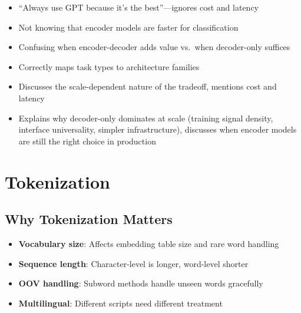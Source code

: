 \begin{interviewq}
\redflags
\begin{itemize}
    \item ``Always use GPT because it's the best''---ignores cost and latency
    \item Not knowing that encoder models are faster for classification
    \item Confusing when encoder-decoder adds value vs.\ when decoder-only suffices
\end{itemize}


\goodgreat
\begin{itemize}
    \item {} Correctly maps task types to architecture families
    \item {} Discusses the scale-dependent nature of the tradeoff, mentions cost and latency
    \item {} Explains why decoder-only dominates at scale (training signal density, interface universality, simpler infrastructure), discusses when encoder models are still the right choice in production
\end{itemize}

\end{interviewq}

\section{Tokenization}
\label{sec:tokenization}

\subsection{Why Tokenization Matters}

\begin{itemize}
    \item \textbf{Vocabulary size}: Affects embedding table size and rare word handling
    \item \textbf{Sequence length}: Character-level is longer, word-level shorter
    \item \textbf{OOV handling}: Subword methods handle unseen words gracefully
    \item \textbf{Multilingual}: Different scripts need different treatment
\end{itemize}

